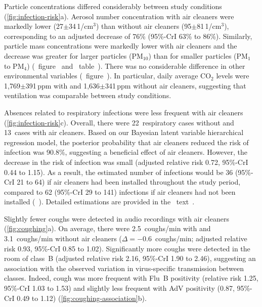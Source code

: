 \documentclass[fleqn,11pt]{wlscirep}
\begin{document}
Particle concentrations differed considerably between study conditions (\cref{fig:infection-risk}a). Aerosol number concentration with air cleaners were markedly lower (27$\pm$34\,1/cm$^3$) than without air cleaners (95$\pm$81\,1/cm$^3$), corresponding to an adjusted decrease of 76\% (95\%-CrI 63\% to 86\%). Similarly, particle mass concentrations were markedly lower with air cleaners and the decrease was greater for larger particles (PM$_{10}$) than for smaller particles (PM$_1$ to PM$_{4}$) (\supp~figure~ and \supp~table~). There was no considerable difference in other environmental variables (\supp~figure~). In particular, daily average CO$_2$ levels were 1,769$\pm$391\,ppm with and 1,636$\pm$341\,ppm without air cleaners, suggesting that ventilation was comparable between study conditions.

Absences related to respiratory infections were less frequent with air cleaners (\cref{fig:infection-risk}c). Overall, there were 22~respiratory cases without and 13~cases with air cleaners. Based on our Bayesian latent variable hierarchical regression model, the posterior probability that air cleaners reduced the risk of infection was 90.8\%, suggesting a beneficial effect of air cleaners. However, the decrease in the risk of infection was small (adjusted relative risk 0.72, 95\%-CrI 0.44 to 1.15). As a result, the estimated number of infections would be 36 (95\%-CrI 21 to 64) if air cleaners had been installed throughout the study period, compared to 62 (95\%-CrI 29 to 141) infections if air cleaners had not been installed (\supp~). Detailed estimations are provided in the \supp~text~. 

Slightly fewer coughs were detected in audio recordings with air cleaners (\cref{fig:coughing}a). On average, there were 2.5~coughs/min with and 3.1~coughs/min without air cleaners ($\Delta=-$0.6~coughs/min; adjusted relative risk 0.93, 95\%-CrI 0.85 to 1.02). Significantly more coughs were detected in the room of class~B (adjusted relative risk 2.16, 95\%-CrI 1.90 to 2.46), suggesting an association with the observed variation in virus-specific transmission between classes. Indeed, cough was more frequent with Flu~B positivity (relative risk 1.25, 95\%-CrI 1.03 to 1.53) and slightly less frequent with AdV positivity (0.87, 95\%-CrI 0.49 to 1.12) (\cref{fig:coughing-association}b). 
\end{document}
